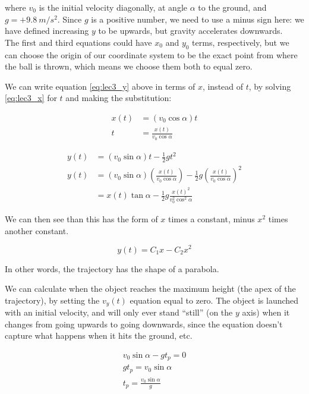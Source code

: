 \documentclass[12pt,a4paper]{report}
\begin{document}
where $v_0$ is the initial velocity diagonally, at angle $\alpha$ to the ground, and $g = +\SI{9.8}{m/s^2}$. Since $g$ is a positive number, we need to use a minus sign here: we have defined increasing $y$ to be upwards, but gravity accelerates downwards.\\
The first and third equations could have $x_0$ and $y_0$ terms, respectively, but we can choose the origin of our coordinate system to be the exact point from where the ball is thrown, which means we choose them both to equal zero.

We can write equation \eqref{eq:lec3_y} above in terms of $x$, instead of $t$, by solving \eqref{eq:lec3_x} for $t$ and making the substitution:

\begin{align}
x(t) &= (v_0 \cos \alpha) t\\
t &= \frac{x(t)}{v_0 \cos \alpha}
\end{align}

\begin{align}
y(t) &= (v_0 \sin \alpha) t - \frac{1}{2} g t^2\\
y(t) &= (v_0 \sin \alpha) \left(\frac{x(t)}{v_0 \cos \alpha}\right) - \frac{1}{2} g \left(\frac{x(t)}{v_0 \cos \alpha}\right)^2\\
     &= x(t) \tan \alpha - \frac{1}{2} g \frac{x(t)^2}{v_0^2 \cos^2 \alpha}
\end{align}

We can then see than this has the form of $x$ times a constant, minus $x^2$ times another constant.

\begin{equation}
y(t) = C_1 x - C_2 x^2
\end{equation}

In other words, the trajectory has the shape of a parabola.

We can calculate when the object reaches the maximum height (the apex of the trajectory), by setting the $v_y(t)$ equation equal to zero. The object is launched with an initial velocity, and will only ever stand ``still'' (on the $y$ axis) when it changes from going upwards to going downwards, since the equation doesn't capture what happens when it hits the ground, etc.

\begin{align}
v_0 \sin \alpha - g t_p = 0\\
g t_p = v_0 \sin \alpha\\
t_p = \frac{v_0 \sin \alpha}{g}
\end{align}
\end{document}
